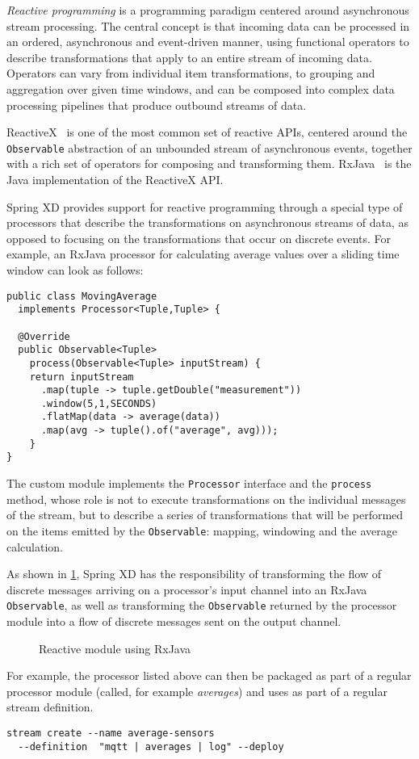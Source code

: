 \emph{Reactive programming} is a programming paradigm centered around asynchronous
stream processing. The central concept is that incoming data can be processed in an
ordered, asynchronous and event-driven manner, using functional operators to describe
transformations that apply to an entire stream of incoming data. Operators can
vary from individual item transformations, to grouping and aggregation over given
time windows, and can be composed into complex data processing pipelines that produce
outbound streams of data.

ReactiveX~\cite{reactivex} is one of the most common set of reactive APIs, centered around
the \texttt{Observable} abstraction of an unbounded stream of asynchronous events,
together with a rich set of operators for composing and transforming them.
RxJava~\cite{rxjava} is the Java implementation of the ReactiveX API.

Spring XD provides support for reactive programming through a special type of
processors that describe the transformations on asynchronous streams of data, as
opposed to focusing on the transformations that occur on discrete events. For example,
an RxJava processor for calculating average values over a sliding time window can look as follows:

\begin{lstlisting}
public class MovingAverage
  implements Processor<Tuple,Tuple> {

  @Override
  public Observable<Tuple>
    process(Observable<Tuple> inputStream) {
    return inputStream
      .map(tuple -> tuple.getDouble("measurement"))
      .window(5,1,SECONDS)
      .flatMap(data -> average(data))
      .map(avg -> tuple().of("average", avg)));
    }
}
\end{lstlisting}

The custom module implements the \texttt{Processor} interface and the
\texttt{process} method, whose role is not to execute transformations
on the individual messages of the stream, but to describe a series of
transformations that will be performed on the items emitted by the
\texttt{Observable}: mapping, windowing and the average calculation.

As shown in \ref{fig:rxjava}, Spring XD has the responsibility of transforming the
flow of discrete messages arriving on a processor's input channel into an
RxJava \texttt{Observable}, as well as transforming the \texttt{Observable}
returned by the processor module into a flow of discrete messages sent on
the output channel.

\begin{figure}[ht]
\centering
{}
\caption{Reactive module using RxJava}
\label{fig:rxjava}
\end{figure}

For example, the processor listed above can then be packaged as part of a regular
 processor module (called, for example \emph{averages}) and uses as part of a
 regular stream definition.

\begin{lstlisting}
stream create --name average-sensors
  --definition  "mqtt | averages | log" --deploy
\end{lstlisting}
